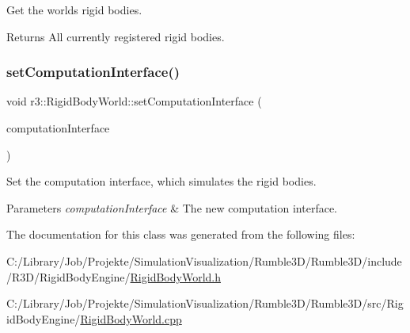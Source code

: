 Get the world\textquotesingle{}s rigid bodies. 

\begin{DoxyReturn}{Returns}
All currently registered rigid bodies. 
\end{DoxyReturn}
\mbox{\label{classr3_1_1_rigid_body_world_a0c5724007917231ebe9bd970d65b0bfe}} 
\subsubsection{\texorpdfstring{set\+Computation\+Interface()}{setComputationInterface()}}
{\footnotesize\ttfamily void r3\+::\+Rigid\+Body\+World\+::set\+Computation\+Interface (\begin{DoxyParamCaption}\item[{\mbox{\hyperlink{classr3_1_1_rigid_body_engine_c_i}{Rigid\+Body\+Engine\+CI}} $\ast$}]{computation\+Interface }\end{DoxyParamCaption})}



Set the computation interface, which simulates the rigid bodies. 


\begin{DoxyParams}{Parameters}
{\em computation\+Interface} & The new computation interface. \\
\hline
\end{DoxyParams}


The documentation for this class was generated from the following files\+:\begin{DoxyCompactItemize}
\item 
C\+:/\+Library/\+Job/\+Projekte/\+Simulation\+Visualization/\+Rumble3\+D/\+Rumble3\+D/include/\+R3\+D/\+Rigid\+Body\+Engine/\mbox{\hyperlink{_rigid_body_world_8h}{Rigid\+Body\+World.\+h}}\item 
C\+:/\+Library/\+Job/\+Projekte/\+Simulation\+Visualization/\+Rumble3\+D/\+Rumble3\+D/src/\+Rigid\+Body\+Engine/\mbox{\hyperlink{_rigid_body_world_8cpp}{Rigid\+Body\+World.\+cpp}}\end{DoxyCompactItemize}
